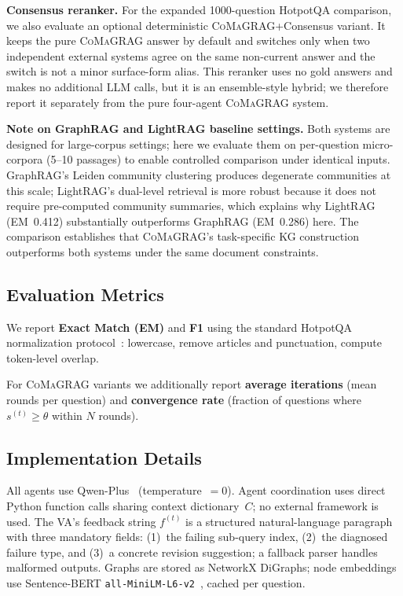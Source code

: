 \documentclass[runningheads]{llncs}
\newcommand{\sys}{\textsc{CoMaGRAG}\xspace}
\begin{document}
\smallskip\noindent\textbf{Consensus reranker.}
For the expanded 1000-question HotpotQA comparison, we also evaluate an
optional deterministic \sys+Consensus variant. It keeps the pure \sys answer by
default and switches only when two independent external systems agree on the
same non-current answer and the switch is not a minor surface-form alias. This
reranker uses no gold answers and makes no additional LLM calls, but it is an
ensemble-style hybrid; we therefore report it separately from the pure
four-agent \sys system.

\smallskip\noindent\textbf{Note on GraphRAG and LightRAG baseline settings.}
Both systems are designed for large-corpus settings; here we evaluate them on
per-question micro-corpora (5--10 passages) to enable controlled comparison
under identical inputs. GraphRAG's Leiden community clustering produces
degenerate communities at this scale; LightRAG's dual-level retrieval is more
robust because it does not require pre-computed community summaries, which
explains why LightRAG (EM~0.412) substantially outperforms GraphRAG (EM~0.286)
here. The comparison establishes that \sys's task-specific KG construction
outperforms both systems under the same document constraints.

\subsection{Evaluation Metrics}

We report \textbf{Exact Match (EM)} and \textbf{F1} using the standard
HotpotQA normalization protocol~\cite{yang2018hotpotqa}: lowercase, remove
articles and punctuation, compute token-level overlap.

For \sys variants we additionally report \textbf{average iterations} (mean
rounds per question) and \textbf{convergence rate} (fraction of questions
where $s^{(t)}\geq\theta$ within $N$ rounds).

\subsection{Implementation Details}

All agents use Qwen-Plus~\cite{qwen2025} (temperature~$=0$). Agent coordination uses direct
Python function calls sharing context dictionary~$C$; no external framework
is used. The VA's feedback string $f^{(t)}$ is a structured natural-language paragraph
with three mandatory fields: (1)~the failing sub-query index, (2)~the diagnosed
failure type, and (3)~a concrete revision suggestion; a fallback parser handles
malformed outputs. Graphs are stored as NetworkX DiGraphs; node embeddings use
Sentence-BERT \texttt{all-MiniLM-L6-v2}~\cite{reimers2019sbert}, cached per question.
\end{document}
